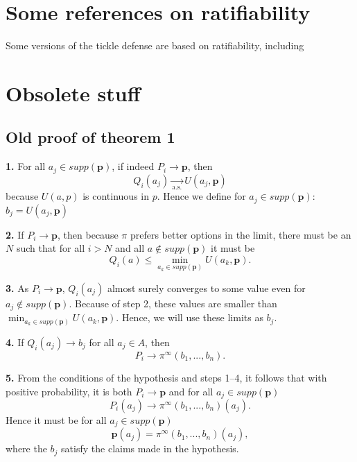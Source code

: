 \documentclass{article}
\begin{document}
\section*{Some references on ratifiability}

Some versions of the tickle defense are based on ratifiability, including 

\section*{Obsolete stuff}

\subsection*{Old proof of theorem 1}

\textbf{1.} For all $a_j\in supp (\mathbf{p})$, if indeed $P_i\rightarrow \mathbf{p}$, then 
\begin{equation}\label{eq:proof-part-one-main-eq}
Q_i(a_j)\underset{\text{a.s.}}{\rightarrow} U(a_j,\mathbf{p})
\end{equation}
because $U(a,p)$ is continuous in $p$. Hence we define for $a_j\in supp (\mathbf{p})$: $b_j=U(a_j,\mathbf{p})$

\textbf{2.} If $P_i\rightarrow \mathbf{p}$, then because $\pi$ prefers better options in the limit, there must be an $N$ such that for all $i>N$ and all $a\notin supp (\mathbf{p})$ it must be
\begin{equation}\label{eq:proof-part-two-main-eq}
Q_i(a)\leq \min_{a_k\in supp (\mathbf{p}) } U(a_k,\mathbf{p}).
\end{equation}

\textbf{3.} As $P_i \rightarrow \mathbf{p}$, $Q_i(a_j)$ almost surely converges to some value even for $a_j\notin supp(\mathbf{p})$. Because of step 2, these values are smaller than $\min_{a_k\in supp (\mathbf{p}) } U(a_k,\mathbf{p})$. Hence, we will use these limits as $b_j$.

\textbf{4.} If $Q_i(a_j)\rightarrow b_j$ for all $a_j\in A$, then
\begin{equation}\label{eq:proof-part-four-main-eq}
P_i \rightarrow \pi^\infty (b_1,...,b_n).
\end{equation}

\textbf{5.} From the conditions of the hypothesis and steps 1--4, it follows that with positive probability, it is both $P_i\rightarrow \mathbf{p}$ and for all $a_j\in supp(\mathbf{p})$
\begin{equation}\label{eq:proof-part-five-main-eq}
P_i(a_j) \rightarrow \pi^\infty  (b_1,...,b_n)(a_j).
\end{equation}
Hence it must be for all $a_j\in supp(\mathbf{p})$
\begin{equation}
\mathbf{p}(a_j)=\pi^\infty (b_1,...,b_n)(a_j),
\end{equation}
where the $b_j$ satisfy the claims made in the hypothesis.
\end{document}
